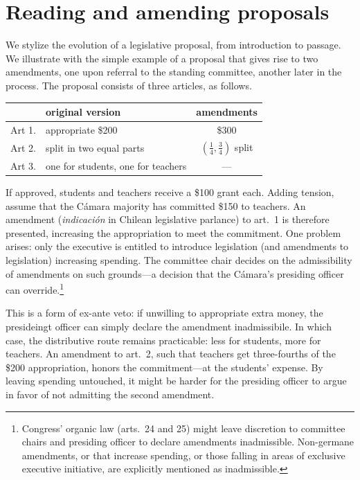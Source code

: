 \documentclass[letter,12pt]{article}
\begin{document}
\section{Reading and amending proposals}

We stylize the evolution of a legislative proposal, from introduction to passage. We illustrate with the simple example of a proposal that gives rise to two amendments, one upon referral to the standing committee, another later in the process. The proposal consists of three articles, as follows. 
\begin{center}
\noindent \begin{tabular}{llc}
       & original version                   & amendments                                       \\ \hline
Art 1. & appropriate \$200                  & \$300                                            \\
Art 2. & split in two equal parts           & $(\frac{1}{4}, \frac{3}{4})$ split \\
Art 3. & one for students, one for teachers & ---                                              \\
\end{tabular}
\end{center}

\noindent If approved, students and teachers receive a \$100 grant each. Adding tension, assume that the C\'amara majority has committed \$150 to teachers. An amendment (\emph{indicación} in Chilean legislative  parlance) to art.\ 1 is therefore presented, increasing the appropriation to meet the commitment. One problem arises: only the executive is entitled to introduce legislation (and amendments to legislation) increasing spending. The committee chair decides on the admissibility of amendments on such grounds---a decision that the C\'amara's presiding officer can override.\footnote{Congress' organic law (arts.\ 24 and 25) might leave discretion to committee chairs and presiding officer to declare amendments inadmissible. Non-germane amendments, or that increase spending, or those falling in areas of exclusive executive initiative, are explicitly mentioned as inadmissible.} 

This is a form of ex-ante veto: if unwilling to appropriate extra money, the presideingt officer can simply declare the amendment inadmissibile. In which case, the distributive route remains practicable: less for students, more for teachers. An amendment to art.\ 2, such that teachers get three-fourths of the \$200 appropriation, honors the commitment---at the students' expense. By leaving spending untouched, it might be harder for the presiding officer to argue in favor of not admitting the second amendment. 
\end{document}
